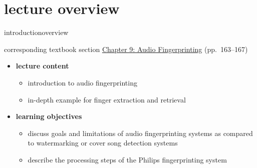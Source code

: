 




\subtitle{Module 9.0: Audio Fingerprinting}


	

    \section[overview]{lecture overview}
        \begin{frame}{introduction}{overview}
            \begin{block}{corresponding textbook section}
                    \href{http://ieeexplore.ieee.org/xpl/articleDetails.jsp?arnumber=6331126}{Chapter 9: Audio Fingerprinting} (pp.~163--167)
            \end{block}

            \begin{itemize}
                \item   \textbf{lecture content}
                    \begin{itemize}
                        \item   introduction to audio fingerprinting
                        \item   in-depth example for finger extraction and retrieval
                    \end{itemize}
                \bigskip
                \item<2->   \textbf{learning objectives}
                    \begin{itemize}
                        \item   discuss goals and limitations of audio fingerprinting systems as compared to watermarking or cover song detection systems
                        \item   describe the processing steps of the Philips fingerprinting system
                    \end{itemize}
            \end{itemize}
        \end{frame}

